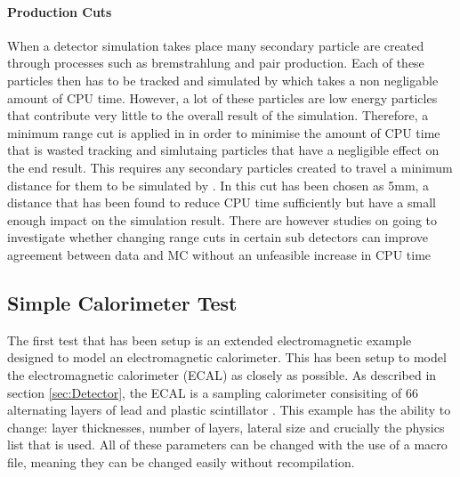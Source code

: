 \paragraph{Production Cuts} When a detector simulation takes place many secondary particle are created through processes such as bremstrahlung and pair production.  Each of these particles then has to be tracked and simulated by \geant which takes a non negligable amount of CPU time. However, a lot of these particles are low energy particles that contribute very little to the overall result of the simulation.  Therefore, a minimum range cut is applied in \geant in order to minimise the amount of CPU time that is wasted tracking and simlutaing particles that have a negligible effect on the end result.  This requires any secondary particles created to travel a minimum distance for them to be simulated by \geant.  In \lhcb this cut has been chosen as 5mm, a distance that has been found to reduce CPU time sufficiently but have a small enough impact on the simulation result.  There are however studies on going to investigate whether changing range cuts in certain sub detectors can improve agreement between data and MC without an unfeasible increase in CPU time %

\subsection{Simple Calorimeter Test}
\label{sec:Simple Calorimeter Test}
The first test that has been setup is an extended electromagnetic \geant example designed to model an electromagnetic calorimeter.  This has been setup to model the \lhcb electromagnetic calorimeter (ECAL) as closely as possible. As described in section \ref{sec:Detector}, the \lhcb ECAL is a sampling calorimeter consisiting of 66 alternating layers of lead and plastic scintillator \cite{LHCb-TDR-002}.  This example has the ability to change: layer thicknesses, number of layers, lateral size and crucially the physics list that is used. All of these parameters can be changed with the use of a \geant macro file, meaning they can be changed easily without recompilation. 

